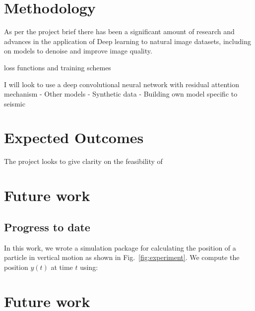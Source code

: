 \documentclass[project-plan]{report-template}
\begin{document}
\section{Methodology}
As per the project brief there has been a significant amount of research and advances in the application of Deep learning to natural image datasets, including on models to denoise and improve image quality.

loss functions and training schemes

I will look to use a deep convolutional neural network with residual attention mechanism
- Other models
- Synthetic data
- Building own model specific to seismic


\section{Expected Outcomes}
The project looks to give clarity on the feasibility of 

\section{Future work}
\subsection{Progress to date}
In this work, we wrote a simulation package for calculating the position of a particle in vertical motion as shown in Fig.~\ref{fig:experiment}. We compute the position $y(t)$ at time $t$ using:

\section{Future work}


\end{document}

